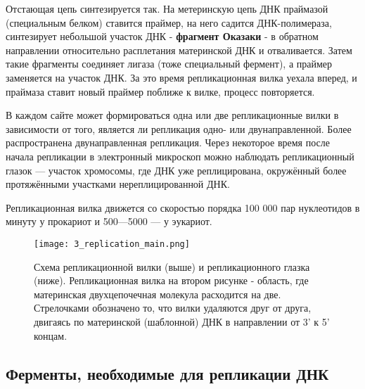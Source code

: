Отстающая цепь синтезируется так. На метеринскую цепь ДНК праймазой (специальным белком) ставится праймер, на него садится ДНК-полимераза, синтезирует небольшой участок ДНК - \textbf{фрагмент Оказаки} - в обратном направлении относительно расплетания материнской ДНК и отваливается. Затем такие фрагменты соединяет лигаза (тоже специальный фермент), а праймер заменяется на участок ДНК. За это время репликационная вилка уехала вперед, и праймаза ставит новый праймер поближе к вилке, процесс повторяется.

В каждом сайте может формироваться одна или две репликационные вилки в зависимости от того, является ли репликация одно- или двунаправленной. Более распространена двунаправленная репликация. Через некоторое время после начала репликации в электронный микроскоп можно наблюдать репликационный глазок — участок хромосомы, где ДНК уже реплицирована, окружённый более протяжёнными участками нереплицированной ДНК.

 Репликационная вилка движется со скоростью порядка 100 000 пар нуклеотидов в минуту у прокариот и 500—5000 — у эукариот.

\begin{figure}[h!]
    \centering
    \texttt{[image: 3\_replication\_main.png]}
    \caption{Схема репликационной вилки (выше) и репликационного глазка (ниже). Репликационная вилка на втором рисунке - область, где материнская двухцепочечная молекула расходится на две. Стрелочками обозначено то, что вилки удаляются друг от друга, двигаясь по материнской (шаблонной) ДНК в направлении от 3' к 5' концам.}
    \label{fig:3_replication_main}
\end{figure}

\subsection{Ферменты, необходимые для репликации ДНК}

